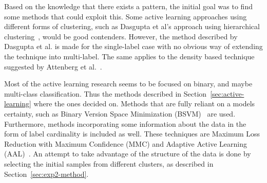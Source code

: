 Based on the knowledge that there exists a pattern, the initial goal was to find some methods that could exploit this.
Some active learning approaches using different forms of clustering, such as Dasgupta et al\@'s approach using hierarchical clustering~\cite{dasgupta2008hierarchical}, would be good contenders.
However, the method described by Dasgupta et al\@. is made for the single-label case with no obvious way of extending the technique into multi-label.
The same applies to the density based technique suggested by Attenberg et al\@.~\cite{attenberg2013class}.

Most of the active learning research seems to be focused on binary, and maybe multi-class classification.
Thus the methods described in Section~\ref{sec:active-learning} where the ones decided on.
Methods that are fully reliant on a models certainty, such as Binary Version Space Minimization (BSVM)~\cite{brinker2006active} are used.
Furthermore, methods incorporating some information about the data in the form of label cardinality is included as well.
These techniques are Maximum Loss Reduction with Maximum Confidence (MMC) and Adaptive Active Learning (AAL)~\cite{yang2009effective, li2013active}.
An attempt to take advantage of the structure of the data is done by selecting the initial samples from different clusters, as described in Section~\ref{sec:exp2-method}.
